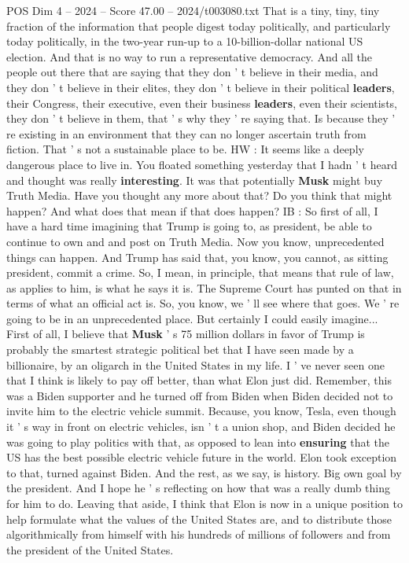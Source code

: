 \begin{textsample}{POS Dim 4 – 2024 – Score 47.00 – 2024/t003080.txt}
That is a tiny, tiny, tiny fraction of the information that people digest today politically, and particularly today politically, in the two-year run-up to a 10-billion-dollar national US election.
And that is no way to run a representative democracy.
And all the people out there that are saying that they don ' t believe in their media, and they don ' t believe in their elites, they don ' t believe in their political \textbf{leaders}, their Congress, their executive, even their business \textbf{leaders}, even their scientists, they don ' t believe in them, that ' s why they ' re saying that.
Is because they ' re existing in an environment that they can no longer ascertain truth from fiction.
That ' s not a sustainable place to be.
HW : It seems like a deeply dangerous place to live in.
You floated something yesterday that I hadn ' t heard and thought was really \textbf{interesting}.
It was that potentially \textbf{Musk} might buy Truth Media.
Have you thought any more about that?
Do you think that might happen?
And what does that mean if that does happen?
IB : So first of all, I have a hard time imagining that Trump is going to, as president, be able to continue to own and and post on Truth Media.
Now you know, unprecedented things can happen.
And Trump has said that, you know, you cannot, as sitting president, commit a crime.
So, I mean, in principle, that means that rule of law, as applies to him, is what he says it is.
The Supreme Court has punted on that in terms of what an official act is.
So, you know, we ' ll see where that goes.
We ' re going to be in an unprecedented place.
But certainly I could easily imagine...
First of all, I believe that \textbf{Musk} ' s 75 million dollars in favor of Trump is probably the smartest strategic political bet that I have seen made by a billionaire, by an oligarch in the United States in my life.
I ' ve never seen one that I think is likely to pay off better, than what Elon just did.
Remember, this was a Biden supporter and he turned off from Biden when Biden decided not to invite him to the electric vehicle summit.
Because, you know, Tesla, even though it ' s way in front on electric vehicles, isn ' t a union shop, and Biden decided he was going to play politics with that, as opposed to lean into \textbf{ensuring} that the US has the best possible electric vehicle future in the world.
Elon took exception to that, turned against Biden.
And the rest, as we say, is history.
Big own goal by the president.
And I hope he ' s reflecting on how that was a really dumb thing for him to do.
Leaving that aside, I think that Elon is now in a unique position to help formulate what the values of the United States are, and to distribute those algorithmically from himself with his hundreds of millions of followers and from the president of the United States.

\end{textsample}
